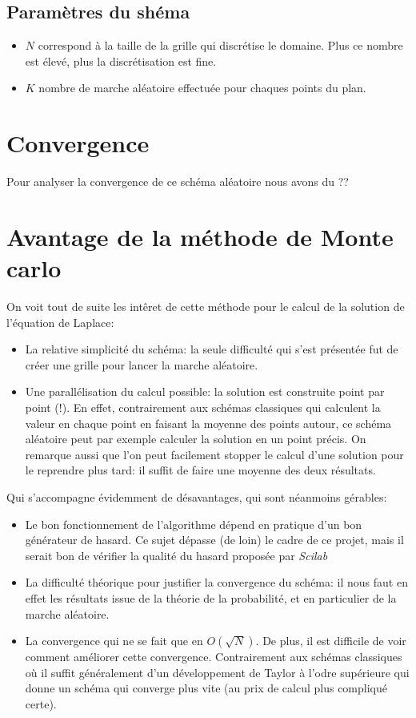 \documentclass[11pt, a4paper]{article}
\begin{document}
\subsection{Paramètres du shéma}

\begin{itemize}
	\item $N$ correspond à la taille de la grille qui discrétise le domaine. Plus ce nombre est
		élevé, plus la discrétisation est fine.
	\item $K$ nombre de marche aléatoire effectuée pour chaques points du plan.
\end{itemize}

\section{Convergence}

Pour analyser la convergence de ce schéma aléatoire nous avons du ??

\section{Avantage de la méthode de Monte carlo}

On voit tout de suite les intêret de cette méthode pour le calcul de la solution de l'équation de
Laplace:
\begin{itemize}
	\item La relative simplicité du schéma: la seule difficulté qui s'est présentée fut de créer
		une grille pour lancer la marche aléatoire.
	\item Une parallélisation du calcul possible: la solution est construite point par point
		(!). En effet, contrairement aux schémas classiques qui calculent la valeur en
		chaque point en faisant la moyenne des points autour, ce schéma aléatoire peut par
		exemple calculer la solution en un point précis. On remarque aussi que l'on peut
		facilement stopper le calcul d'une solution pour le reprendre plus tard: il suffit
		de faire une moyenne des deux résultats.
\end{itemize}

Qui s'accompagne évidemment de désavantages, qui sont néanmoins gérables:
\begin{itemize}
	\item Le bon fonctionnement de l'algorithme dépend en pratique d'un bon générateur de
		hasard. Ce sujet dépasse (de loin) le cadre de ce projet, mais il serait bon de
		vérifier la qualité du hasard proposée par \emph{Scilab}

	\item La difficulté théorique pour justifier la convergence du schéma: il nous faut en effet
		les résultats issue de la théorie de la probabilité, et en particulier de la marche
		aléatoire.
	\item La convergence qui ne se fait que en $O(\sqrt{N})$. De plus, il est difficile de voir
		comment améliorer cette convergence. Contrairement aux schémas classiques où il
		suffit généralement d'un développement de Taylor à l'odre supérieure qui donne un
		schéma qui converge plus vite (au prix de calcul plus compliqué certe).
\end{itemize}
\end{document}
